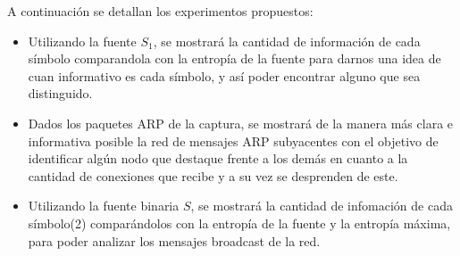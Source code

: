 A continuación se detallan los experimentos propuestos:

\begin{itemize}

	\item Utilizando la fuente $S_1$, se mostrará la cantidad de información de cada símbolo comparandola con la entropía de la fuente para darnos una idea de cuan informativo es cada símbolo, y así poder encontrar alguno que sea distinguido.
	\item Dados los paquetes ARP de la captura, se mostrará de la manera más clara e informativa posible la red de mensajes ARP subyacentes con el objetivo de identificar algún nodo que destaque frente a los demás en cuanto a la cantidad de conexiones que recibe y a su vez se desprenden de este.
	\item Utilizando la fuente binaria $S$, se mostrará la cantidad de infomación de cada símbolo(2) comparándolos con la entropía de la fuente y la entropía máxima, para poder analizar los mensajes broadcast de la red. 

\end{itemize}